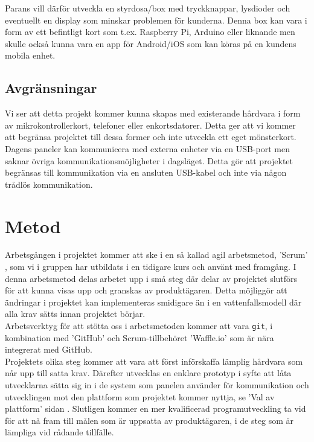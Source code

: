 \documentclass[a4paper]{article}
\begin{document}
			\noindent Parans vill därför utveckla en styrdosa/box med tryckknappar, lysdioder och eventuellt en display som minskar problemen för kunderna.
			Denna box kan vara i form av ett befintligt kort som t.ex. Raspberry Pi, Arduino eller liknande men skulle också kunna vara en app för Android/iOS som kan köras på en kundens mobila enhet.

		\subsection{Avgränsningar} %
		\label{sub:avgransningar}
			
			Vi ser att detta projekt kommer kunna skapas med existerande hårdvara i form av mikrokontrollerkort, telefoner eller enkortsdatorer. Detta ger att vi kommer att begränsa projektet till dessa former och inte utveckla ett eget mönsterkort.\\

			\noindent Dagens paneler kan kommunicera med externa enheter via en USB-port men saknar övriga kommunikationsmöjligheter i dagsläget. Detta gör att projektet begränsas till kommunikation via en ansluten USB-kabel och inte via någon trådlös kommunikation.


	\newpage

	\section{Metod} %
	\label{sec:metod}
		Arbetsgången i projektet kommer att ske i en så kallad agil arbetsmetod, 'Scrum' , som vi i gruppen har utbildats i en tidigare kurs och använt med framgång. I denna arbetsmetod delas arbetet upp i små steg där delar av projektet slutförs för att kunna visas upp och granskas av produktägaren. Detta möjliggör att ändringar i projektet kan implementeras smidigare än i en vattenfallsmodell där alla krav sätts innan projektet börjar. \\

		\noindent Arbetsverktyg för att stötta oss i arbetsmetoden kommer att vara \texttt{git}, i kombination med 'GitHub' och Scrum-tillbehöret 'Waffle.io'  som är nära integrerat med GitHub. \\

		\noindent Projektets olika steg kommer att vara att först införskaffa lämplig hårdvara som når upp till satta krav. Därefter utvecklas en enklare prototyp i syfte att låta utvecklarna sätta sig in i de system som panelen använder för kommunikation och utvecklingen mot den plattform som projektet kommer nyttja, se 'Val av plattform' sidan \pageref{sec:val_av_plattform}. Slutligen kommer en mer kvalificerad programutveckling ta vid för att nå fram till målen som är uppsatta av produktägaren, i de steg som är lämpliga vid rådande tillfälle.
\end{document}
